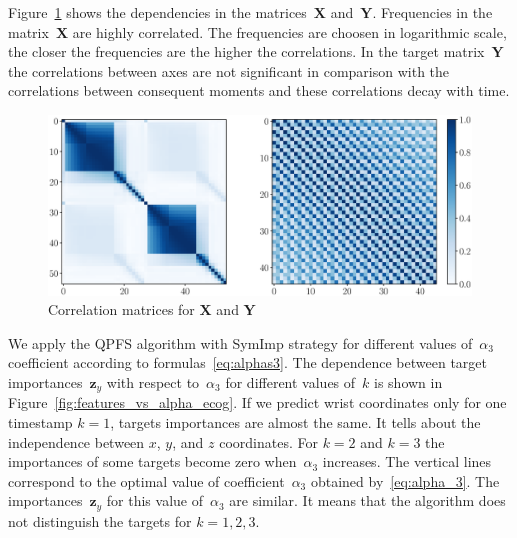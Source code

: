 \documentclass[12pt,twoside]{article}
\theoremstyle{definition}
\newcommand{\bz}{\mathbf{z}}
\newcommand{\bY}{\mathbf{Y}}
\newcommand{\bX}{\mathbf{X}}
\begin{document}
Figure~\ref{fig:corr_matrix} shows the dependencies in the matrices~$\bX$ and~$\bY$. Frequencies in the matrix~$\bX$ are highly correlated. 
The frequencies are choosen in logarithmic scale, the closer the frequencies are the higher the correlations.
In the target matrix~$\bY$ the correlations between axes are not significant in comparison with the correlations between consequent moments and these correlations decay with time.
\begin{figure}[h]
	\includegraphics[width=\linewidth]{figs/corr_matrix.eps}
	\caption{Correlation matrices for $\bX$ and $\bY$}
	\label{fig:corr_matrix}
\end{figure}

We apply the QPFS algorithm with SymImp strategy for different values of~$\alpha_3$ coefficient according to formulas~\eqref{eq:alphas3}.
The dependence between target importances~$\bz_y$ with respect to~$\alpha_3$ for different values of~$k$ is shown in Figure~\ref{fig:features_vs_alpha_ecog}.
If we predict wrist coordinates only for one timestamp $k = 1$, targets importances are almost the same.
It tells about the independence between $x$, $y$, and $z$ coordinates.
For $k = 2$ and $k = 3$ the importances of some targets become zero when~$\alpha_3$ increases.
The vertical lines correspond to the optimal value of coefficient~$\alpha_3$ obtained by~\eqref{eq:alpha_3}. 
The importances~$\bz_y$ for this value of~$\alpha_3$ are similar. 
It means that the algorithm does not distinguish the targets for $k=1, 2, 3$.
\end{document}
